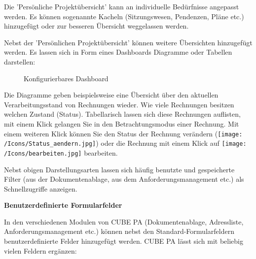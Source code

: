 Die 'Persönliche Projektübersicht' kann an individuelle Bedürfnisse angepasst werden. Es können sogenannte Kacheln (Sitzungswesen, Pendenzen, Pläne etc.) hinzugefügt oder zur besseren Übersicht weggelassen werden.

\vspace{\baselineskip}

Nebst der 'Persönlichen Projektübersicht' können weitere Übersichten hinzugefügt werden. Es lassen sich in Form eines Dashboards Diagramme oder Tabellen darstellen:

\begin{figure}[H]
\caption{Konfigurierbares Dashboard}
\end{figure}

Die Diagramme geben beispielsweise eine Übersicht über den aktuellen Verarbeitungsstand von Rechnungen wieder. Wie viele Rechnungen besitzen welchen Zustand (Status). Tabellarisch lassen sich diese Rechnungen auflisten, mit einem Klick gelangen Sie in den Betrachtungsmodus einer Rechnung. Mit einem weiteren Klick können Sie den Status der Rechnung verändern (\texttt{[image: /Icons/Status\_aendern.jpg]}) oder die Rechnung mit einem Klick auf \texttt{[image: /Icons/bearbeiten.jpg]} bearbeiten.

\vspace{\baselineskip}

Nebst obigen Darstellungsarten lassen sich häufig benutzte und gespeicherte Filter (aus der Dokumentenablage, aus dem Anforderungsmanagement etc.) als Schnellzugriffe anzeigen. 

\vspace{\baselineskip}

\textbf{Benutzerdefinierte Formularfelder}

\vspace{\baselineskip}

In den verschiedenen Modulen von CUBE PA (Dokumentenablage, Adressliste, Anforderungsmanagement etc.) können nebst den Standard-Formularfeldern benutzerdefinierte Felder hinzugefügt werden. CUBE PA lässt sich mit beliebig vielen Feldern ergänzen:

\vspace{\baselineskip}

